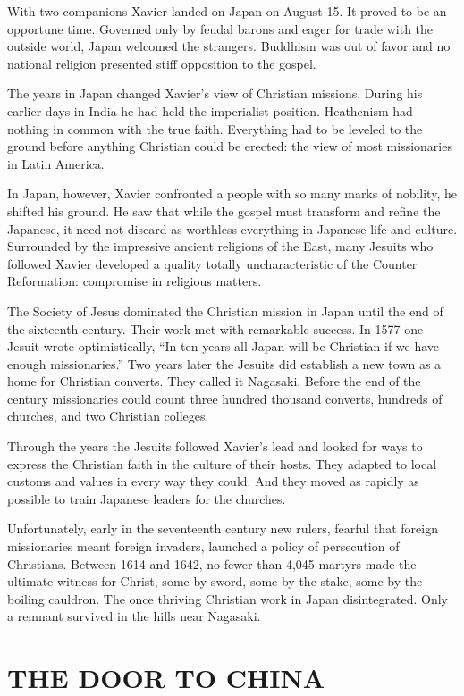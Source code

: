 With two companions Xavier landed on Japan on August 15. It proved to be an opportune time. Governed
only by feudal barons and eager for trade with the outside world, Japan welcomed the strangers.
Buddhism was out of favor and no national religion presented stiff opposition to the gospel.

The years in Japan changed Xavier’s view of Christian missions. During his earlier days in India he
had held the imperialist position. Heathenism had nothing in common with the true faith. Everything
had to be leveled to the ground before anything Christian could be erected: the view of most
missionaries in Latin America.

In Japan, however, Xavier confronted a people with so many marks of nobility, he shifted his ground.
He saw that while the gospel must transform and refine the Japanese, it need not discard as
worthless everything in Japanese life and culture. Surrounded by the impressive ancient religions of
the East, many Jesuits who followed Xavier developed a quality totally uncharacteristic of the
Counter Reformation: compromise in religious matters.

The Society of Jesus dominated the Christian mission in Japan until the end of the sixteenth
century. Their work met with remarkable success. In 1577 one Jesuit wrote optimistically, “In ten
years all Japan will be Christian if we have enough missionaries.” Two years later the Jesuits did
establish a new town as a home for Christian converts. They called it Nagasaki. Before the end of
the century missionaries could count three hundred thousand converts, hundreds of churches, and two
Christian colleges.

Through the years the Jesuits followed Xavier’s lead and looked for ways to express the Christian
faith in the culture of their hosts. They adapted to local customs and values in every way they
could. And they moved as rapidly as possible to train Japanese leaders for the churches.

Unfortunately, early in the seventeenth century new rulers, fearful that foreign missionaries meant
foreign invaders, launched a policy of persecution of Christians. Between 1614 and 1642, no fewer
than 4,045 martyrs made the ultimate witness for Christ, some by sword, some by the stake, some by
the boiling cauldron. The once thriving Christian work in Japan disintegrated. Only a remnant
survived in the hills near Nagasaki.

\section{THE DOOR TO CHINA}


